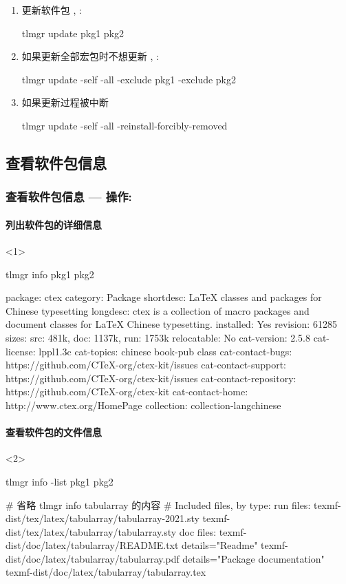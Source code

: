 \begin{frame}[fragile,t]
\begin{enumerate}[<3->]
    \item 更新软件包 , :
\begin{cmdcode}
tlmgr update pkg1 pkg2
\end{cmdcode}
    \item 如果更新全部宏包时不想更新 , :
\begin{cmdcode}
tlmgr update -self -all -exclude pkg1 -exclude pkg2
\end{cmdcode}
    \item 如果更新过程被中断
\begin{cmdcode}
tlmgr update -self -all -reinstall-forcibly-removed
\end{cmdcode}
  \end{enumerate}
\end{frame}

\subsection{查看软件包信息}

\begin{frame}[fragile]
  \frametitle{查看软件包信息 --- 操作: }
  \framesubtitle<1>{列出软件包的详细信息}

  \begin{onlyenv}<1>
\begin{cmdcode}
tlmgr info pkg1 pkg2
\end{cmdcode}
\begin{outputcode}
package:     ctex
category:    Package
shortdesc:   LaTeX classes and packages for Chinese typesetting
longdesc:    ctex is a collection of macro packages and document classes for LaTeX Chinese typesetting.
installed:   Yes
revision:    61285
sizes:       src: 481k, doc: 1137k, run: 1753k
relocatable: No
cat-version: 2.5.8
cat-license: lppl1.3c
cat-topics:  chinese book-pub class
cat-contact-bugs: https://github.com/CTeX-org/ctex-kit/issues
cat-contact-support: https://github.com/CTeX-org/ctex-kit/issues
cat-contact-repository: https://github.com/CTeX-org/ctex-kit
cat-contact-home: http://www.ctex.org/HomePage
collection:  collection-langchinese
\end{outputcode}
  \end{onlyenv}

  \framesubtitle<2>{查看软件包的文件信息}
  \begin{onlyenv}<2>
\begin{cmdcode}
tlmgr info -list pkg1 pkg2
\end{cmdcode}
\begin{outputcode}
# 省略 tlmgr info tabularray 的内容 #
Included files, by type:
run files:
texmf-dist/tex/latex/tabularray/tabularray-2021.sty
texmf-dist/tex/latex/tabularray/tabularray.sty
doc files:
texmf-dist/doc/latex/tabularray/README.txt details="Readme"
texmf-dist/doc/latex/tabularray/tabularray.pdf details="Package documentation"
texmf-dist/doc/latex/tabularray/tabularray.tex  
\end{outputcode}
  \end{onlyenv}
\end{frame}

